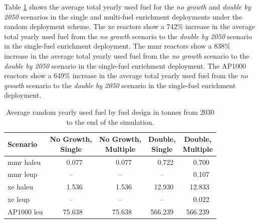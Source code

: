 Table \ref{tab:random_used_avg} shows the average total yearly used fuel for the \textit{no growth} and \textit{double by 2050} scenarios in the single and multi-fuel enrichment deployments under the random deployment scheme. The \gls{xe} reactors show a 742\% increase in the average total yearly used fuel from the \textit{no growth} scenario to the \textit{double by 2050} scenario in the single-fuel enrichment deployment. The \gls{mmr} reactors show a 838\% increase in the average total yearly used fuel from the \textit{no growth} scenario to the \textit{double by 2050} scenario in the single-fuel enrichment deployment. The AP1000 reactors show a 649\% increase in the average total yearly used fuel from the \textit{no growth} scenario to the \textit{double by 2050} scenario in the single-fuel enrichment deployment.

\begin{table}[H]
    \centering
    \caption{Average random yearly used fuel by fuel design in tonnes from 2030 to the end of the simulation.}
    \label{tab:random_used_avg}
    \begin{tabular}{l c c c c}
       \toprule
       Scenario & \shortstack{No Growth,\\ Single} & \shortstack{No Growth,\\ Multiple} & \shortstack{Double,\\ Single} & \shortstack{Double,\\ Multiple}  \\
       \midrule
       \gls{mmr} \gls{haleu}   & \textcolor{white}{00}0.077    & \textcolor{white}{00}0.077   & \textcolor{white}{00}0.722    & \textcolor{white}{00}0.700    \\
       \gls{mmr} \gls{leup}    & --       & --      & --       & \textcolor{white}{00}0.107    \\
       \gls{xe} \gls{haleu}    & \textcolor{white}{00}1.536    & \textcolor{white}{00}1.536   & \textcolor{white}{0}12.930   & \textcolor{white}{0}12.833   \\
       \gls{xe} \gls{leup}     & --       & --      & --       & \textcolor{white}{00}0.022    \\
       AP1000 \gls{leu}        & \textcolor{white}{0}75.638   & \textcolor{white}{0}75.638  & 566.239  & 566.239  \\
       \bottomrule
    \end{tabular}
\end{table}

